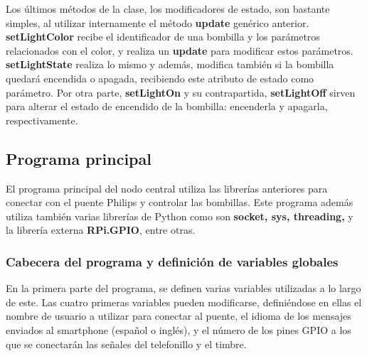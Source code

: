         \vspace{0.3cm}

        Los últimos métodos de la clase, los modificadores de estado, son bastante simples, al utilizar internamente el método \textbf{update} genérico anterior. \textbf{setLightColor} recibe el identificador de una bombilla y los parámetros relacionados con el color, y realiza un \textbf{update} para modificar estos parámetros. \textbf{setLightState} realiza lo mismo y además, modifica también si la bombilla quedará encendida o apagada, recibiendo este atributo de estado como parámetro. Por otra parte, \textbf{setLightOn} y su contrapartida, \textbf{setLightOff} sirven para alterar el estado de encendido de la bombilla: encenderla y apagarla, respectivamente.

    \subsection{Programa principal}

        El programa principal del nodo central utiliza las librerías anteriores para conectar con el puente Philips y controlar las bombillas. Este programa además utiliza también varias librerías de Python como son \textbf{socket, sys, threading,} y la librería externa \textbf{RPi.GPIO}, entre otras.
        
        \subsubsection{Cabecera del programa y definición de variables globales}

        \vspace{0.3cm}

        En la primera parte del programa, se definen varias variables utilizadas a lo largo de este. Las cuatro primeras variables pueden modificarse, definiéndose en ellas el nombre de usuario a utilizar para conectar al puente, el idioma de los mensajes enviados al smartphone (español o inglés), y el número de los pines GPIO a los que se conectarán las señales del telefonillo y el timbre. \\


